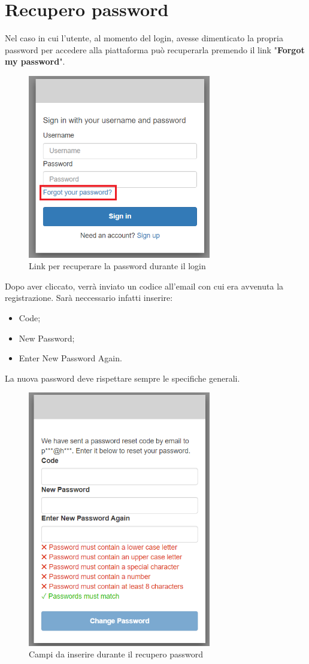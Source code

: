 \section{Recupero password} {
    Nel caso in cui l'utente, al momento del login, avesse dimenticato la propria password per accedere alla piattaforma 
    \platform può recuperarla premendo il link "\textbf{Forgot my password}". 
    \begin{figure}[H]
        \includegraphics[width=8cm]{sezioni/images/psw-forgot.png}
        \centering
        \caption{Link per recuperare la password durante il login}
    \end{figure}

    Dopo aver cliccato, verrà inviato un codice all'email con cui era avvenuta la registrazione. Sarà neccessario infatti inserire: 
    \begin{itemize}
        \item Code;
        \item New Password;
        \item Enter New Password Again.
    \end{itemize} 
    La nuova password deve rispettare sempre le specifiche generali.
    \begin{figure}[H]
        \includegraphics[width=8cm]{sezioni/images/rec-psw.png}
        \centering
        \caption{Campi da inserire durante il recupero password}
    \end{figure}

}
